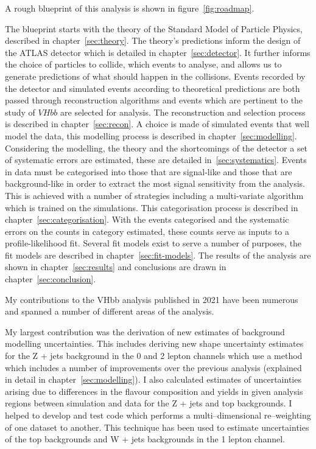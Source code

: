 A rough blueprint of this analysis is shown in figure~\ref{fig:roadmap}.

The blueprint starts with the theory of the Standard Model of Particle Physics,
described in chapter~\ref{sec:theory}. The theory's predictions inform the
design of the ATLAS detector which is detailed in chapter~\ref{sec:detector}. It
further informs the choice of particles to collide, which events to analyse, and
allows us to generate predictions of what should happen in the collisions.
Events recorded by the detector and simulated events according to theoretical
predictions are both passed through reconstruction algorithms and events which
are pertinent to the study of $VHbb$ are selected for analysis. The
reconstruction and selection process is described in chapter~\ref{sec:recon}. A
choice is made of simulated events that well model the data, this modelling
process is described in chapter~\ref{sec:modelling}. Considering the modelling,
the theory and the shortcomings of the detector a set of systematic errors are
estimated, these are detailed in~\ref{sec:systematics}. Events in data must be
categorised into those that are signal-like and those that are background-like
in order to extract the most signal sensitivity from the analysis. This is
achieved with a number of strategies including a multi-variate algorithm which
is trained on the simulations. This categorisation process is described in
chapter~\ref{sec:categorisation}. With the events categorised and the systematic
errors on the counts in category estimated, these counts serve as inputs to a
profile-likelihood fit. Several fit models exist to serve a number of purposes,
the fit models are described in chapter~\ref{sec:fit-models}. The results of the
analysis are shown in chapter~\ref{sec:results} and conclusions are drawn in
chapter~\ref{sec:conclusion}.


My contributions to the VHbb analysis published in 2021 have been numerous and
spanned a number of different areas of the analysis.

My largest contribution was the derivation of new estimates of background
modelling uncertainties. This includes deriving new shape uncertainty estimates
for the Z + jets background in the 0 and 2 lepton channels which use a method
which includes a number of improvements over the previous analysis (explained in
detail in chapter~\ref{sec:modelling}). I also calculated estimates of
uncertainties arising due to differences in the flavour composition and yields
in given analysis regions between simulation and data for the Z + jets and top
backgrounds. I helped to develop and test code which performs a
multi--dimensional re--weighting of one dataset to another. This technique has
been used to estimate uncertainties of the top backgrounds and W + jets
backgrounds in the 1 lepton channel.

